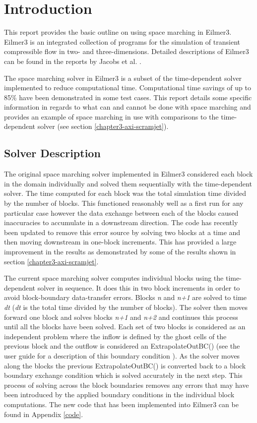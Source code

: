 
\newpage
\section{Introduction}
\label{chapter-introduction}
%
This report provides the basic outline on using space marching in Eilmer3. Eilmer3 is an integrated collection of programs for the simulation of transient compressible flow in two- and three-dimensions. Detailed descriptions of Eilmer3 can be found in the reports by Jacobs et al. \cite{Jacobs2008,Jacobs2010}.

The space marching solver in Eilmer3 is a subset of the time-dependent solver implemented to reduce computational time. Computational time savings of up to 85\% have been demonstrated in some test cases. This report details some specific information in regards to what can and cannot be done with space marching and provides an example of space marching in use with comparisons to the time-dependent solver (see section \ref{chapter3-axi-scramjet}).

\subsection{Solver Description}

The original space marching solver implemented in Eilmer3 considered each block in the domain individually and solved them sequentially with the time-dependent solver. The time computed for each block was the total simulation time divided by the number of blocks. This functioned reasonably well as a first run for any particular case however the data exchange between each of the blocks caused inaccuracies to accumulate in a downstream direction. The code has recently been updated to remove this error source by solving two blocks at a time and then moving downstream in one-block increments. This has provided a large improvement in the results as demonstrated by some of the results shown in section \ref{chapter3-axi-scramjet}.

The current space marching solver computes individual blocks using the time-dependent solver in sequence. It does this in two block increments in order to avoid block-boundary data-transfer errors. Blocks \textit{n} and \textit{n+1} are solved to time \textit{dt} (\textit{dt} is the total time divided by the number of blocks). The solver then moves forward one block and solves blocks \textit{n+1} and \textit{n+2} and continues this process until all the blocks have been solved. Each set of two blocks is considered as an independent problem where the inflow is defined by the ghost cells of the previous block and the outflow is considered an ExtrapolateOutBC() (see the user guide for a description of this boundary condition \cite{Jacobs2008}). As the solver moves along the blocks the previous ExtrapolateOutBC() is converted back to a block boundary exchange condition which is solved accurately in the next step. This process of solving across the block boundaries removes any errors that may have been introduced by the applied boundary conditions in the individual block computations. The new code that has been implemented into Eilmer3 can be found in Appendix \ref{code}.

